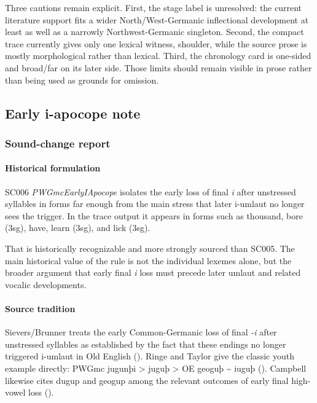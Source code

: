 \documentclass[
  british,
  a4paper,
]{article}
\begin{document}
Three cautions remain explicit. First, the stage label is unresolved:
the current literature support fits a wider North/West-Germanic
inflectional development at least as well as a narrowly
Northwest-Germanic singleton. Second, the compact trace currently gives
only one lexical witness, shoulder, while the source prose is mostly
morphological rather than lexical. Third, the chronology card is
one-sided and broad/far on its later side. Those limits should remain
visible in prose rather than being used as grounds for omission.

\subsection{Early i-apocope note}\label{early-i-apocope-note}

\subsubsection{Sound-change report}\label{sound-change-report-3}

\paragraph{Historical formulation}\label{historical-formulation-3}

SC006 \emph{PWGmcEarlyIApocope} isolates the early loss of final
\emph{i} after unstressed syllables in forms far enough from the main
stress that later i-umlaut no longer sees the trigger. In the trace
output it appears in forms such as thousand, bore (3sg), have, learn
(3sg), and lick (3sg).

That is historically recognizable and more strongly sourced than SC005.
The main historical value of the rule is not the individual lexemes
alone, but the broader argument that early final \emph{i} loss must
precede later umlaut and related vocalic developments.

\paragraph{Source tradition}\label{source-tradition-3}

Sievers/Brunner treats the early Common-Germanic loss of final \emph{-i}
after unstressed syllables as established by the fact that these endings
no longer triggered i-umlaut in Old English
(). Ringe
and Taylor give the classic youth example directly: PWGmc jugunþi
\textgreater{} juguþ \textgreater{} OE geoguþ \textasciitilde{} iuguþ
(). Campbell
likewise cites dugup and geogup among the relevant outcomes of early
final high-vowel loss ().
\end{document}
